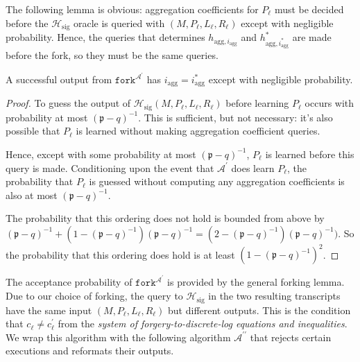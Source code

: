 \documentclass{iacrtrans}
\theoremstyle{definition}
\numberwithin{theorem}{subsection}
\numberwithin{lemma}{theorem}
\newcommand{\adversary}{\mathcal{A}}
\newcommand{\p}{\mathfrak{p}}
\begin{document}
The following lemma is obvious: aggregation coefficients for $P_\ell$ must be decided before the $\mathcal{H}_{\text{sig}}$ oracle is queried with $(M, P_\ell, L_\ell, R_\ell)$ except with negligible probability. Hence, the queries that determines $h_{\text{agg},i_{\text{agg}}}$ and $h_{\text{agg},i_{\text{agg}}^*}^*$ are made before the fork, so they must be the same queries.
\begin{lemma}
A successful output from $\texttt{fork}^{\adversary^\prime}$ has $i_{\text{agg}} = i^*_{\text{agg}}$ except with negligible probability.
\end{lemma}
\begin{proof}
To guess the output of $\mathcal{H}_{\text{sig}}(M, P_\ell, L_\ell, R_\ell)$ before learning $P_\ell$ occurs with probability at most $(\p - q)^{-1}$. This is sufficient, but not necessary: it's also possible that $P_\ell$ is learned without making aggregation coefficient queries.

Hence, except with some probability at most $(\p - q)^{-1}$, $P_\ell$ is learned before this query is made. Conditioning upon the event that $\adversary^\prime$ does learn $P_\ell$, the probability that $P_\ell$ is guessed without computing any aggregation coefficients is also at most $(\p -q )^{-1}$.

The probability that this ordering does not hold is bounded from above by $(\p - q)^{-1} + (1 - (\p - q)^{-1})(\p - q)^{-1} = (2 - (\p - q)^{-1})(\p - q)^{-1})$. So the probability that this ordering does hold is at least $(1-(\p-q)^{-1})^2$.
\end{proof}


The acceptance probability of  $\texttt{fork}^{\adversary^\prime}$ is provided by the general forking lemma. Due to our choice of forking, the query to $\mathcal{H}_{\text{sig}}$ in the two resulting transcripts have the same input $(M, P_\ell, L_\ell, R_\ell)$ but different outputs. This is the condition that $c_\ell \neq c_\ell^{\prime}$ from the \textit{system of forgery-to-discrete-log equations and inequalities}. We wrap this algorithm with the following algorithm $\adversary^{\prime \prime}$ that rejects certain executions and reformats their outputs.
\end{document}
